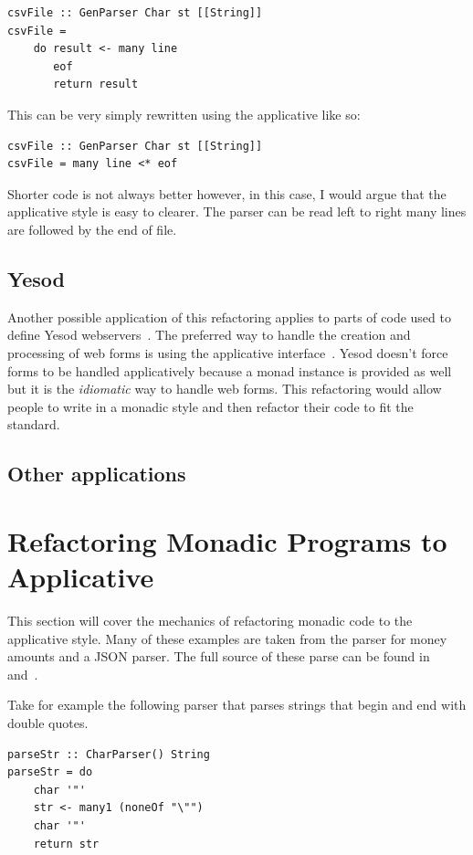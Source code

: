 \begin{lstlisting}[frame=tblr]
csvFile :: GenParser Char st [[String]]
csvFile = 
    do result <- many line
       eof
       return result
\end{lstlisting}

This can be very simply rewritten using the applicative like so:

\begin{lstlisting}[frame=tblr]
csvFile :: GenParser Char st [[String]]
csvFile = many line <* eof 
\end{lstlisting}      
 
 Shorter code is not always better however, in this case,  I would argue that the applicative style is easy to clearer. The parser can be read left to right many lines are followed by the end of file.
 
\subsection{Yesod}
Another possible application of this refactoring applies to parts of code used to define Yesod webservers~\citep{yesod}. The preferred way to handle the creation and processing of web forms is using the applicative interface~\citep{yesodBook}. Yesod doesn't force forms to be handled applicatively because a monad instance is provided as well but it is the \textit{idiomatic} way to handle web forms. This refactoring would allow people to write in a monadic style and then refactor their code to fit the standard.

\subsection{Other applications}
  

\section{Refactoring Monadic Programs to Applicative}
\label{sec:appRefact}
This section will cover the mechanics of refactoring monadic code to the applicative style. Many of these examples are taken from the parser for money amounts and a JSON parser. The full source of these parse can be found in~\cite{moneyParse} and~\cite{jsonParser}.

Take for example the following parser that parses strings that begin and end with double quotes.

\begin{lstlisting}[frame=tlrb]
parseStr :: CharParser() String
parseStr = do
	char '"'
	str <- many1 (noneOf "\"")
	char '"'
	return str
\end{lstlisting}

